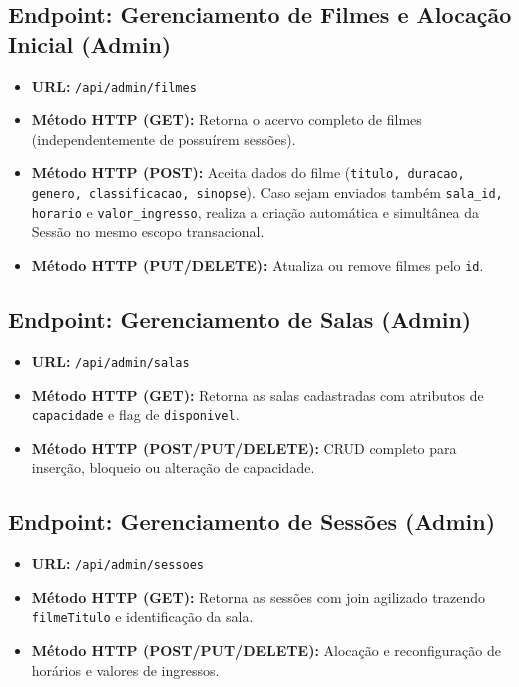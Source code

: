 \subsection{Endpoint: Gerenciamento de Filmes e Alocação Inicial (Admin)}
\begin{itemize}
    \item \textbf{URL:} \texttt{/api/admin/filmes}
    \item \textbf{Método HTTP (GET):} Retorna o acervo completo de filmes (independentemente de possuírem sessões).
    \item \textbf{Método HTTP (POST):} Aceita dados do filme (\texttt{titulo, duracao, genero, classificacao, sinopse}). Caso sejam enviados também \texttt{sala\_id, horario} e \texttt{valor\_ingresso}, realiza a criação automática e simultânea da Sessão no mesmo escopo transacional.
    \item \textbf{Método HTTP (PUT/DELETE):} Atualiza ou remove filmes pelo \texttt{id}.
\end{itemize}

\subsection{Endpoint: Gerenciamento de Salas (Admin)}
\begin{itemize}
    \item \textbf{URL:} \texttt{/api/admin/salas}
    \item \textbf{Método HTTP (GET):} Retorna as salas cadastradas com atributos de \texttt{capacidade} e flag de \texttt{disponivel}.
    \item \textbf{Método HTTP (POST/PUT/DELETE):} CRUD completo para inserção, bloqueio ou alteração de capacidade.
\end{itemize}

\subsection{Endpoint: Gerenciamento de Sessões (Admin)}
\begin{itemize}
    \item \textbf{URL:} \texttt{/api/admin/sessoes}
    \item \textbf{Método HTTP (GET):} Retorna as sessões com join agilizado trazendo \texttt{filmeTitulo} e identificação da sala.
    \item \textbf{Método HTTP (POST/PUT/DELETE):} Alocação e reconfiguração de horários e valores de ingressos.
\end{itemize}

